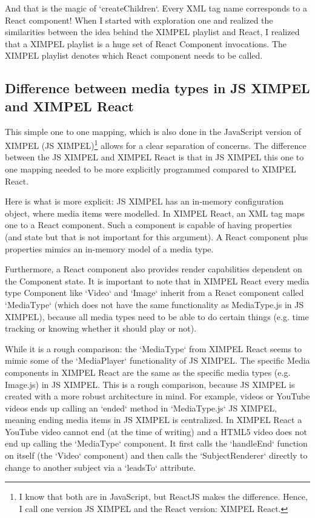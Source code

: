 And that is the magic of `createChildren`. Every XML tag name corresponds to a React component! When I started with exploration one and realized the similarities between the idea behind the XIMPEL playlist and React, I realized that a XIMPEL playlist is a huge set of React Component invocations. The XIMPEL playlist denotes which React component needs to be called.

\subsection{Difference between media types in JS XIMPEL and XIMPEL React}
This simple one to one mapping, which is also done in the JavaScript version of XIMPEL (JS XIMPEL)\footnote{I know that both are in JavaScript, but ReactJS makes the difference. Hence, I call one version JS XIMPEL and the React version: XIMPEL React.} allows for a clear separation of concerns. The difference between the JS XIMPEL and XIMPEL React is that in JS XIMPEL this one to one mapping needed to be more explicitly programmed compared to XIMPEL React. 

Here is what is more explicit: JS XIMPEL has an in-memory configuration object, where media items were modelled. In XIMPEL React, an XML tag maps one to a React component. Such a component is capable of having properties (and state but that is not important for this argument). A React component plus properties mimics an in-memory model of a media type. 

Furthermore, a React component also provides render capabilities dependent on the Component state. It is important to note that in XIMPEL React every media type Component like `Video` and `Image` inherit from a React component called `MediaType` (which does not have the same functionality as MediaType.js in JS XIMPEL), because all media types need to be able to do certain things (e.g. time tracking or knowing whether it should play or not). 

While it is a rough comparison: the `MediaType` from XIMPEL React seems to mimic some of the `MediaPlayer` functionality of JS XIMPEL. The specific Media components in XIMPEL React are the same as the specific media types (e.g. Image.js) in JS XIMPEL. This is a rough comparison, because JS XIMPEL is created with a more robust architecture in mind. For example, videos or YouTube videos ends up calling an `ended` method in `MediaType.js` JS XIMPEL, meaning ending media items in JS XIMPEL is centralized. In XIMPEL React a YouTube video cannot end (at the time of writing) and a HTML5 video does not end up calling the `MediaType` component. It first calls the `handleEnd` function on itself (the `Video` component) and then calls the `SubjectRenderer` directly to change to another subject via a `leadsTo` attribute. 

